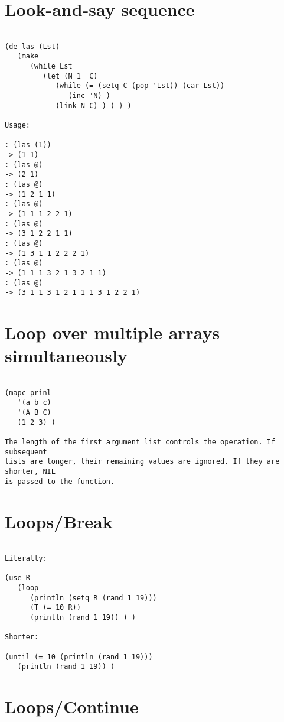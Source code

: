\section*{Look-and-say sequence}

\begin{verbatim}

(de las (Lst)
   (make
      (while Lst
         (let (N 1  C)
            (while (= (setq C (pop 'Lst)) (car Lst))
               (inc 'N) )
            (link N C) ) ) ) )

Usage:

: (las (1))
-> (1 1)
: (las @)
-> (2 1)
: (las @)
-> (1 2 1 1)
: (las @)
-> (1 1 1 2 2 1)
: (las @)
-> (3 1 2 2 1 1)
: (las @)
-> (1 3 1 1 2 2 2 1)
: (las @)
-> (1 1 1 3 2 1 3 2 1 1)
: (las @)
-> (3 1 1 3 1 2 1 1 1 3 1 2 2 1)

\end{verbatim}

\section*{Loop over multiple arrays simultaneously}

\begin{verbatim}

(mapc prinl
   '(a b c)
   '(A B C)
   (1 2 3) )

The length of the first argument list controls the operation. If subsequent
lists are longer, their remaining values are ignored. If they are shorter, NIL
is passed to the function.

\end{verbatim}

\section*{Loops/Break}

\begin{verbatim}

Literally:

(use R
   (loop
      (println (setq R (rand 1 19)))
      (T (= 10 R))
      (println (rand 1 19)) ) )

Shorter:

(until (= 10 (println (rand 1 19)))
   (println (rand 1 19)) )

\end{verbatim}

\section*{Loops/Continue}

